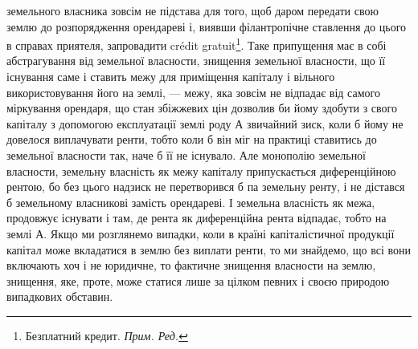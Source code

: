 \parcont{}  %
земельного власника зовсім не підстава для того, щоб даром передати свою землю
до розпорядження орендареві і, виявши філантропічне ставлення до цього в
справах приятеля, запровадити crédit gratuit\footnote*{
Безплатний кредит. \emph{Прим. Ред.}
}. Таке припущення має в собі
абстрагування від земельної власности, знищення земельної власности, що її
існування саме і ставить межу для приміщення капіталу і вільного використовування
його на землі, — межу, яка зовсім не відпадає від самого міркування
орендаря, що стан збіжжевих цін дозволив би йому здобути з свого
капіталу з допомогою експлуатації землі роду А звичайний зиск, коли б йому
не довелося виплачувати ренти, тобто коли б він міг на практиці ставитись до
земельної власности так, наче б її не існувало. Але монополію земельної власности,
земельну власність як межу капіталу припускається диференційною
рентою, бо без цього надзиск не перетворився б па земельну ренту, і не дістався
б земельному власникові замість орендареві. І земельна власність як межа,
продовжує існувати і там, де рента як диференційна рента відпадає, тобто на
землі А. Якщо ми розглянемо випадки, коли в країні капіталістичної продукції
капітал може вкладатися в землю без виплати ренти, то ми знайдемо, що всі
вони включають хоч і не юридичне, то фактичне знищення власности на землю,
знищення, яке, проте, може статися лише за цілком певних і своєю природою
випадкових обставин.

